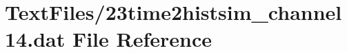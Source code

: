 \hypertarget{23time2histsim__channel14_8dat}{}\section{Text\+Files/23time2histsim\+\_\+channel14.dat File Reference}
\label{23time2histsim__channel14_8dat}
